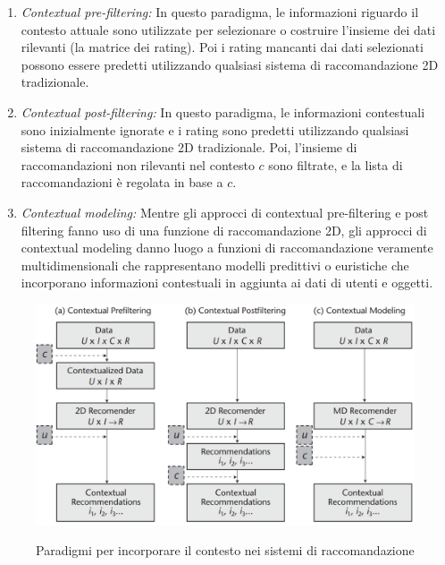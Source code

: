\begin{enumerate}
 \item \textit{Contextual pre-filtering:} In questo paradigma, le informazioni riguardo il contesto attuale sono utilizzate per selezionare o costruire l'insieme dei dati rilevanti (la matrice dei rating). Poi i rating mancanti dai dati selezionati possono essere predetti utilizzando qualsiasi sistema di raccomandazione 2D tradizionale.
 \item \textit{Contextual post-filtering:} In questo paradigma, le informazioni contestuali sono inizialmente ignorate e i rating sono predetti utilizzando qualsiasi sistema di raccomandazione 2D tradizionale. Poi, l'insieme di raccomandazioni non rilevanti nel contesto $c$ sono filtrate, e la lista di raccomandazioni è regolata in base a $c$.
 \item  \textit{Contextual modeling:} Mentre gli approcci di contextual pre-filtering e post filtering fanno uso di una funzione di raccomandazione 2D, gli approcci di contextual modeling danno luogo a funzioni di raccomandazione veramente multidimensionali che rappresentano modelli predittivi o euristiche che incorporano informazioni contestuali in aggiunta ai dati di utenti e oggetti.
\end{enumerate}

\begin{figure}
  \centering
  \includegraphics[width=\linewidth]{immagini/paradigm_for_context_inclusion.png}
  \caption{Paradigmi per incorporare il contesto nei sistemi di raccomandazione}
  \cite{context-paradigm}
  \label{fig:context-paradigm}
\end{figure}

